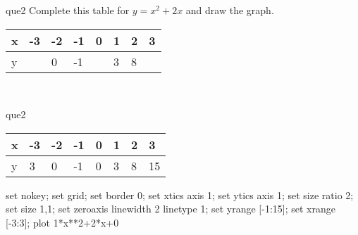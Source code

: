 \documentclass[13.5pt, varwidth=true]{beamer}
\begin{document}
\begin{frame}[shrink=19,fragile]
	\begin{beamercolorbox}[rounded=true, left, shadow=true,wd=14.8cm]{que2}
		 Complete this table for $y = x^{2} + 2x$ and draw the graph. \\[0.3cm] \renewcommand{\arraystretch}{1.2}\begin{tabular}{|C|C|C|C|C|C|C|C|} \hline x & -3 & -2 & -1 & 0 & 1 & 2 & 3 \\ \hline y &  & 0 & -1 &  & 3 & 8 & \\ \hline \end{tabular}\\[0.3cm]
	\end{beamercolorbox}
\end{frame}
\begin{frame}[shrink=19,fragile]
	\begin{beamercolorbox}[rounded=true, left, shadow=true,wd=14.8cm]{que2}
		\renewcommand{\arraystretch}{1.2}\begin{tabular}{|C|C|C|C|C|C|C|C|} \hline x & -3 & -2 & -1 & 0 & 1 & 2 & 3 \\ \hline y & 3 & 0 & -1 & 0 & 3 & 8 & 15\\ \hline \end{tabular}\begin{gnuplot}[terminal=pdf] set nokey; set grid; set border 0; set xtics axis 1; set ytics axis 1; set size ratio 2; set size 1,1; set zeroaxis linewidth 2 linetype 1; set yrange [-1:15]; set xrange [-3:3]; plot 1*x**2+2*x+0 \end{gnuplot}
	\end{beamercolorbox}
\end{frame}
\end{document}
